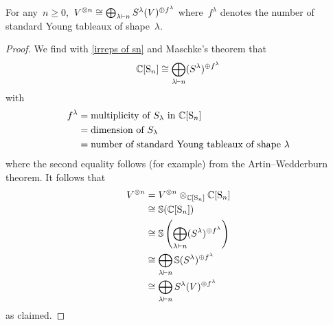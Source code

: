 \documentclass[a4paper,10pt]{scrartcl}
\begin{document}
\begin{corollary}
  For any~$n \geq 0$,~$V^{\otimes n} \cong \bigoplus_{\lambda \vdash n} S^{\lambda}(V)^{\oplus f^\lambda}$ where~$f^\lambda$ denotes the number of standard Young tableaux of shape~$\lambda$.
\end{corollary}


\begin{proof}
  We find with \cref{irreps of sn} and Maschke’s theorem that
  \[
    \mathbb{C}[\operatorname{S}_n]
    \cong
    \bigoplus_{\lambda \vdash n} (S^\lambda)^{\oplus f^\lambda}
  \]
  with
  \begin{align*}
    f^\lambda
    &=
    \text{multiplicity of~$S_\lambda$ in~$\mathbb{C}[\operatorname{S}_n]$}
    \\
    &=
    \text{dimension of~$S_\lambda$}
    \\
    &=
    \text{number of standard Young tableaux of shape~$\lambda$}
  \end{align*}
  where the second equality follows (for example) from the Artin--Wedderburn theorem.
  It follows that
  \begin{align*}
    V^{\otimes n}
    &=
    V^{\otimes n} \otimes_{\mathbb{C}[\operatorname{S}_n]} \mathbb{C}[\operatorname{S}_n]
    \\
    &\cong
    \mathbb{S}(\mathbb{C}[\operatorname{S}_n])
    \\
    &\cong
    \mathbb{S}\left( \bigoplus_{\lambda \vdash n} (S^\lambda)^{\oplus f^\lambda} \right)
    \\
    &\cong
    \bigoplus_{\lambda \vdash n} \mathbb{S}(S^\lambda)^{\oplus f^\lambda}
    \\
    &\cong
    \bigoplus_{\lambda \vdash n} S^{\lambda}(V)^{\oplus f^\lambda}
  \end{align*}
  as claimed.
\end{proof}


\end{document}

